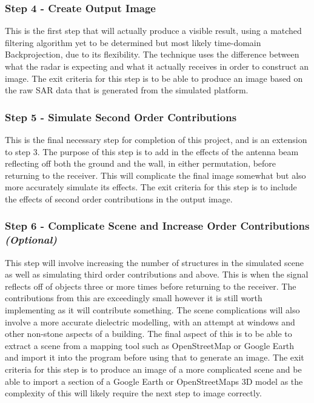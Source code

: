 \subsubsection{Step 4 - Create Output Image}
This is the first step that will actually produce a visible result, using a matched filtering algorithm yet to be determined but most likely time-domain Backprojection, due to its flexibility. The technique uses the difference between what the radar is expecting and what it actually receives in order to construct an image. The exit criteria for this step is to be able to produce an image based on the raw SAR data that is generated from the simulated platform.

\subsubsection{Step 5 - Simulate Second Order Contributions}
This is the final necessary step for completion of this project, and is an extension to step 3. The purpose of this step is to add in the effects of the antenna beam reflecting off both the ground and the wall, in either permutation, before returning to the receiver. This will complicate the final image somewhat but also more accurately simulate its effects. The exit criteria for this step is to include the effects of second order contributions in the output image.

\subsubsection{Step 6 - Complicate Scene and Increase Order Contributions \textit{(Optional)}}
This step will involve increasing the number of structures in the simulated scene as well as simulating third order contributions and above. This is when the signal reflects off of objects three or more times before returning to the receiver. The contributions from this are exceedingly small however it is still worth implementing as it will contribute something. The scene complications will also involve a more accurate dielectric modelling, with an attempt at windows and other non-stone aspects of a building. The final aspect of this is to be able to extract a scene from a mapping tool such as OpenStreetMap or Google Earth and import it into the program before using that to generate an image. The exit criteria for this step is to produce an image of a more complicated scene and be able to import a section of a Google Earth or OpenStreetMaps 3D model as the complexity of this will likely require the next step to image correctly.

